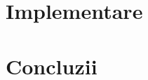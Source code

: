 \documentclass[12pt, a4paper, oneside, romanian]{teza-upb}
\begin{document}









\chapter{Implementare}

\chapter*{Concluzii}




\end{document}
